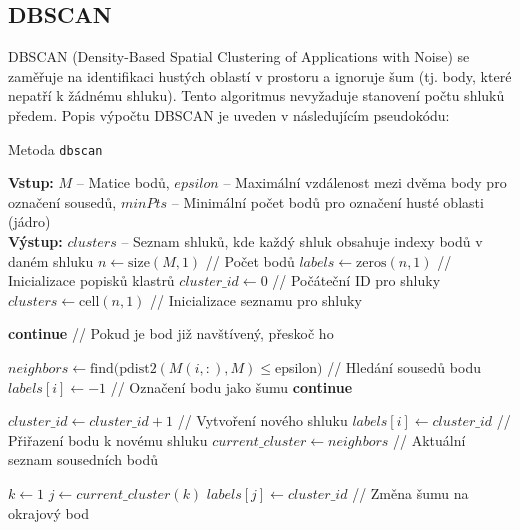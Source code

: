 \subsection{DBSCAN}

DBSCAN (Density-Based Spatial Clustering of Applications with Noise) se zaměřuje na identifikaci hustých oblastí v prostoru a ignoruje šum (tj. body, které nepatří k žádnému shluku). Tento algoritmus nevyžaduje stanovení počtu shluků předem. Popis výpočtu DBSCAN je uveden v následujícím pseudokódu:

\begin{algorithm}
    \caption{Metoda \texttt{dbscan}}
    \begin{algorithmic}[1]
        \STATE \textbf{Vstup:} $M$ -- Matice bodů, $epsilon$ -- Maximální vzdálenost mezi dvěma body pro označení sousedů, $minPts$ -- Minimální počet bodů pro označení husté oblasti (jádro)\\
        \STATE \textbf{Výstup:} $clusters$ -- Seznam shluků, kde každý shluk obsahuje indexy bodů v daném shluku
        \STATE $n \gets \text{size}(M, 1)$ // Počet bodů
        \STATE $labels \gets \text{zeros}(n, 1)$ // Inicializace popisků klastrů
        \STATE $cluster\_id \gets 0$ // Počáteční ID pro shluky
        \STATE $clusters \gets \text{cell}(n, 1)$ // Inicializace seznamu pro shluky

                \STATE \textbf{continue} // Pokud je bod již navštívený, přeskoč ho
            \ENDIF

            \STATE $neighbors \gets \text{find}(\text{pdist2}(M(i, :), M) \leq $epsilon$)$ // Hledání sousedů bodu
                \STATE $labels[i] \gets -1$ // Označení bodu jako šumu
                \STATE \textbf{continue}
            \ENDIF

            \STATE $cluster\_id \gets cluster\_id + 1$ // Vytvoření nového shluku
            \STATE $labels[i] \gets cluster\_id$ // Přiřazení bodu k novému shluku
            \STATE $current\_cluster \gets neighbors$ // Aktuální seznam sousedních bodů

            \STATE $k \gets 1$
                \STATE $j \gets current\_cluster(k)$
                    \STATE $labels[j] \gets cluster\_id$ // Změna šumu na okrajový bod
                \ENDIF


\end{algorithmic}
\end{algorithm}
